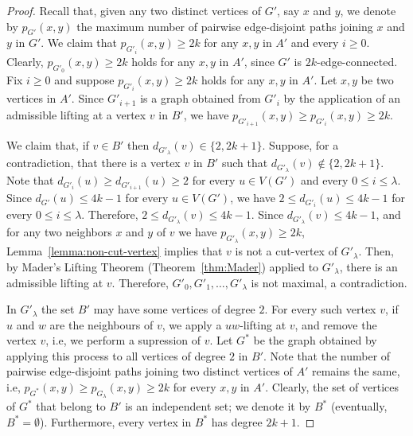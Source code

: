\documentclass[12pt,reqno,a4paper]{amsart}
\begin{document}
\begin{proof}
Recall that, given any two distinct vertices of \(G'\), say \(x\) and \(y\), we denote by \(p_{G'}(x,y)\)
the maximum number of pairwise edge-disjoint paths joining \(x\) and \(y\) in \({G'}\).
We claim that \(p_{G'_i}(x,y) \geq 2k\) for any \(x,y\) in \(A'\) and every \(i\geq 0\).
Clearly, \(p_{G'_0}(x,y) \geq 2k\) holds for any \(x,y\) in \(A'\), since \(G'\) is \(2k\)-edge-connected.
Fix \(i\geq 0\) and suppose \(p_{G'_i}(x,y) \geq 2k\) holds for any \(x,y\) in \(A'\).
Let \(x,y\) be two vertices in \(A'\).
Since \(G'_{i+1}\) is a graph obtained from \(G'_i\) by the application 
of an admissible lifting at a vertex \(v\) in \(B'\), 
we have \(p_{G'_{i+1}}(x,y) \geq p_{G'_i}(x,y) \geq 2k\).

We claim that, if \(v\in B'\)
then \(d_{G'_\lambda}(v) \in \{2,2k+1\}\).
Suppose, for a contradiction, that there is a vertex \(v\) in \(B'\) 
such that \(d_{G'_\lambda}(v) \notin \{2,2k+1\}\).
Note that \(d_{G'_i}(u) \geq d_{G'_{i+1}}(u)\geq 2\)
for every \(u\in V(G')\) and every \(0\leq i\leq \lambda\).
Since \(d_{G'}(u) \leq 4k-1\) for every \(u\in V(G')\),
we have \(2\leq d_{G'_i}(u)\leq 4k-1\) for every \(0\leq i\leq \lambda\).
Therefore, \(2\leq d_{G'_\lambda}(v)\leq 4k-1\).
Since \(d_{G'_\lambda}(v) \leq 4k-1\),
and for any two neighbors $x$ and $y$ of \(v\) we have \(p_{G'_\lambda}(x,y)\geq 2k\),
Lemma~\ref{lemma:non-cut-vertex} implies that \(v\) is not a cut-vertex of \(G'_\lambda\).
Then, by Mader's Lifting Theorem (Theorem~\ref{thm:Mader}) applied to \(G'_\lambda\),
there is an admissible lifting at \(v\).
Therefore, \(G'_0,G'_1,\ldots,G'_\lambda\) is not maximal, a contradiction.



In \(G'_\lambda\) the set $B'$ may have some vertices of degree $2$. 
For every such vertex $v$, if $u$ and $w$ are the neighbours of $v$, we apply a \(uw\)-lifting at $v$, 
and remove the vertex $v$, i.e, we perform a supression of \(v\).
Let \(G^*\) be the graph obtained by applying this process to all vertices of degree $2$ in $B'$.
Note that the number of pairwise edge-disjoint paths joining two distinct vertices of \(A'\)
remains the same, i.e, \(p_{G^*}(x,y) \geq p_{G_\lambda}(x,y)\geq 2k\) for every \(x,y\) in \(A'\).
Clearly, the 
set of vertices of $G^*$ that belong to $B'$ is an independent set;  
we denote it by $B^*$  (eventually, \(B^* = \emptyset\)). 
Furthermore, every vertex in \(B^*\) has degree \(2k+1\).



\end{proof}
\end{document}
